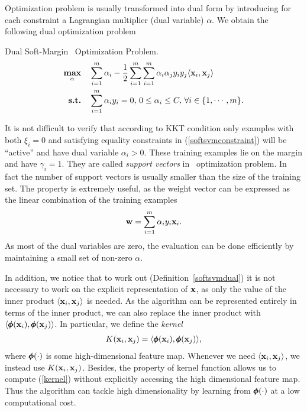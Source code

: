 {%
Optimization problem is usually transformed into dual form by introducing for each constraint a Lagrangian multiplier (dual variable) $\alpha$.
We obtain the following dual optimization problem
\begin{definition}{Dual Soft-Margin \svm\ Optimization Problem.}\label{softsvmdual}
	\begin{align*}
		\underset{\mathbf {\alpha}}{\textbf{max}} & \quad\sum_{i=1}^{m}\alpha_i -\frac{1}{2}\sum_{i=1}^{m}\sum_{i=1}^{m}\alpha_i\alpha_jy_iy_j\langle \mathbf {x}_i, \mathbf {x}_j \rangle\\
		\textbf{s.t.} & \quad \sum_{i=1}^{m}\alpha_iy_i=0, \, 0\le\alpha_i\le C, \, \forall i\in\{1,\cdots,m\}.
	\end{align*}
\end{definition}
It is not difficult to verify that according to KKT condition only examples with both $\xi_i=0$ and satisfying equality constraints in (\ref{softsvmconstraint}) will be ``active'' and have dual variable $\alpha_i>0$.
These training examples lie on the margin and have $\gamma_i=1$.
They are called \textit{support vectors} in \svm\ optimization problem.
In fact the number of support vectors is usually smaller than the size of the training set.
The property is extremely useful, as the weight vector can be expressed as the linear combination of the training examples
\begin{align*}
	\mathbf {w} = \sum_{i=1}^{m}\alpha_iy_i\mathbf {x}_i.
\end{align*}
As most of the dual variables are zero, the evaluation can be done efficiently by maintaining a small set of non-zero $\alpha$.

In addition, we notice that to work out (Definition~\ref{softsvmdual}) it is not necessary to work on the explicit representation of $\mathbf {x}$, as only the value of the inner product $\langle \mathbf {x}_i, \mathbf {x}_j \rangle$ is needed.
As the algorithm can be represented entirely in terms of the inner product, we can also replace the inner product with $\langle \pmb \phi(\mathbf {x}_i), \pmb \phi(\mathbf {x}_j) \rangle$.
In particular, we define the \textit{kernel}
\begin{align}
	K(\mathbf {x}_i,\mathbf {x}_j) = \langle \pmb \phi(\mathbf {x}_i), \pmb \phi(\mathbf {x}_j) \rangle, \label{kernel}
\end{align}
where $\pmb \phi(\cdot)$ is some high-dimensional feature map.
Whenever we need $\langle \mathbf {x}_i, \mathbf {x}_j \rangle$, we instead use $K(\mathbf {x}_i,\mathbf {x}_j)$.
Besides, the property of kernel function \citep{Scholkopf02learning} allows us to compute (\ref{kernel}) without explicitly accessing the high dimensional feature map.
Thus the algorithm can tackle high dimensionality by learning from $\pmb \phi(\cdot)$ at a low computational cost.

}
